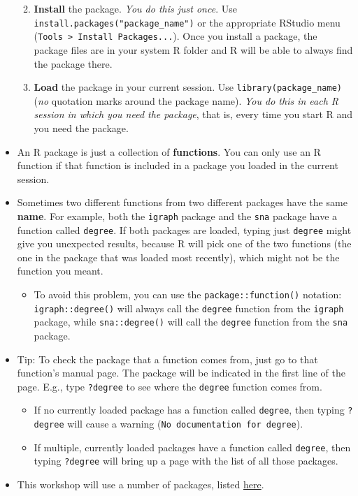 \documentclass[
]{book}
\providecommand{\tightlist}{%
  \setlength{\itemsep}{0pt}\setlength{\parskip}{0pt}}
\begin{document}
\begin{itemize}
  \begin{enumerate}
  \def\labelenumi{\arabic{enumi}.}
  \tightlist
  \item
    \textbf{Install} the package. \emph{You do this just once}. Use \texttt{install.packages("package\_name")} or the appropriate RStudio menu (\texttt{Tools\ \textgreater{}\ Install\ Packages...}). Once you install a package, the package files are in your system R folder and R will be able to always find the package there.
  \item
    \textbf{Load} the package in your current session. Use \texttt{library(package\_name)} (\emph{no} quotation marks around the package name). \emph{You do this in each R session in which you need the package}, that is, every time you start R and you need the package.
  \end{enumerate}
\item
  An R package is just a collection of \textbf{functions}. You can only use an R function if that function is included in a package you loaded in the current session.
\item
  Sometimes two different functions from two different packages have the same \textbf{name}. For example, both the \texttt{igraph} package and the \texttt{sna} package have a function called \texttt{degree}. If both packages are loaded, typing just \texttt{degree} might give you unexpected results, because R will pick one of the two functions (the one in the package that was loaded most recently), which might not be the function you meant.

  \begin{itemize}
  \tightlist
  \item
    To avoid this problem, you can use the \texttt{package::function()} notation: \texttt{igraph::degree()} will always call the \texttt{degree} function from the \texttt{igraph} package, while \texttt{sna::degree()} will call the \texttt{degree} function from the \texttt{sna} package.
  \end{itemize}
\item
  Tip: To check the package that a function comes from, just go to that function's manual page. The package will be indicated in the first line of the page. E.g., type \texttt{?degree} to see where the \texttt{degree} function comes from.

  \begin{itemize}
  \tightlist
  \item
    If no currently loaded package has a function called \texttt{degree}, then typing \texttt{?degree} will cause a warning (\texttt{No\ documentation\ for\ \textquotesingle{}degree\textquotesingle{}}).
  \item
    If multiple, currently loaded packages have a function called \texttt{degree}, then typing \texttt{?degree} will bring up a page with the list of all those packages.
  \end{itemize}
\item
  This workshop will use a number of packages, listed \protect\hyperlink{packages}{here}.
\end{itemize}
\end{document}
